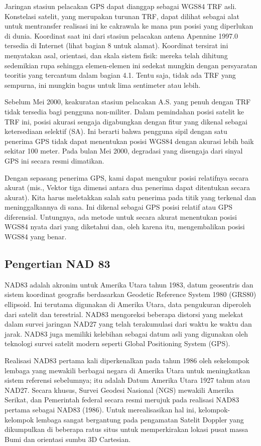 Jaringan stasiun pelacakan GPS dapat dianggap sebagai WGS84 TRF asli. Konstelasi satelit, yang merupakan turunan TRF, dapat dilihat sebagai alat untuk mentransfer realisasi ini ke cakrawala ke mana pun posisi yang diperlukan di dunia. Koordinat saat ini dari stasiun pelacakan antena Apennine 1997.0 tersedia di Internet (lihat bagian 8 untuk alamat). Koordinat tersirat ini menyatakan asal, orientasi, dan skala sistem fisik: mereka telah dihitung sedemikian rupa sehingga elemen-elemen ini sedekat mungkin dengan persyaratan teoritis yang tercantum dalam bagian 4.1. Tentu saja, tidak ada TRF yang sempurna, ini mungkin bagus untuk lima sentimeter atau lebih.

Sebelum Mei 2000, keakuratan stasiun pelacakan A.S. yang penuh dengan TRF tidak tersedia bagi pengguna non-militer. Dalam pemindahan posisi satelit ke TRF ini, posisi akurasi sengaja digabungkan dengan fitur yang dikenal sebagai ketersediaan selektif (SA). Ini berarti bahwa pengguna sipil dengan satu penerima GPS tidak dapat menentukan posisi WGS84 dengan akurasi lebih baik sekitar 100 meter. Pada bulan Mei 2000, degradasi yang disengaja dari sinyal GPS ini secara resmi dimatikan.

Dengan sepasang penerima GPS, kami dapat mengukur posisi relatifnya secara akurat (mis., Vektor tiga dimensi antara dua penerima dapat ditentukan secara akurat). Kita harus meletakkan salah satu penerima pada titik yang terkenal dan meninggalkannya di sana. Ini dikenal sebagai GPS posisi relatif atau GPS diferensial. Untungnya, ada metode untuk secara akurat menentukan posisi WGS84 nyata dari yang diketahui dan, oleh karena itu, mengembalikan posisi WGS84 yang benar.

\subsection{Pengertian NAD 83}
NAD83 adalah akronim untuk Amerika Utara tahun 1983, datum geosentris dan sistem koordinat geografis berdasarkan Geodetic Reference System 1980 (GRS80) ellipsoid. Ini terutama digunakan di Amerika Utara, data pengukuran diperoleh dari satelit dan terestrial. NAD83 mengoreksi beberapa distorsi yang melekat dalam survei jaringan NAD27 yang telah terakumulasi dari waktu ke waktu dan jarak. NAD83 juga memiliki kelebihan sebagai datum asli yang digunakan oleh teknologi survei satelit modern seperti Global Positioning System (GPS).

Realisasi NAD83 pertama kali diperkenalkan pada tahun 1986 oleh sekelompok lembaga yang mewakili berbagai negara di Amerika Utara untuk meningkatkan sistem referensi sebelumnya; itu adalah Datum Amerika Utara 1927 tahun atau NAD27. Secara khusus, Survei Geodesi Nasional (NGS) mewakili Amerika Serikat, dan Pemerintah federal secara resmi merujuk pada realisasi NAD83 pertama sebagai NAD83 (1986). Untuk merealisasikan hal ini, kelompok-kelompok lembaga sangat bergantung pada pengamatan Satelit Doppler yang dikumpulkan di beberapa ratus situs untuk memperkirakan lokasi pusat massa Bumi dan orientasi sumbu 3D Cartesian.

